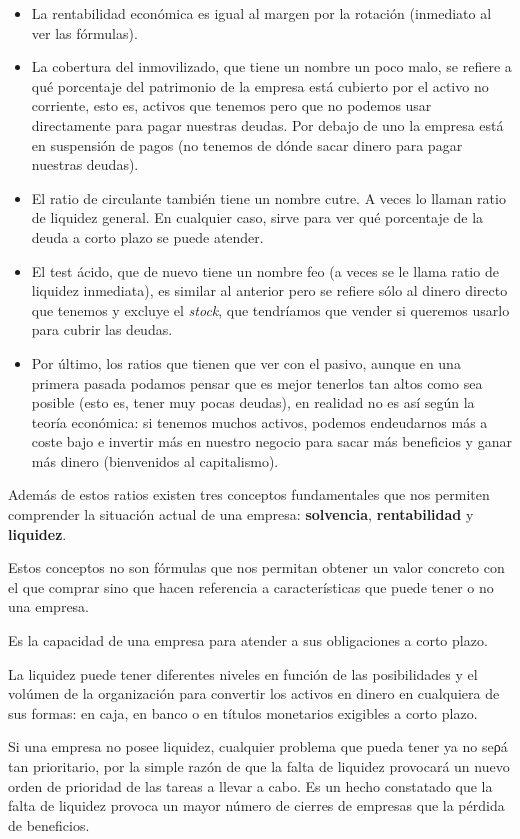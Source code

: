 \documentclass[nochap,palatino,shortheader]{apuntes}
\begin{document}
\begin{itemize}
\item La rentabilidad económica es igual al margen por la rotación (inmediato al ver las fórmulas).
\item La cobertura del inmovilizado, que tiene un nombre un poco malo, se refiere a qué porcentaje del patrimonio de la empresa está cubierto por el activo no corriente, esto es, activos que tenemos pero que no podemos usar directamente para pagar nuestras deudas. Por debajo de uno la empresa está en suspensión de pagos (no tenemos de dónde sacar dinero para pagar nuestras deudas).
\item El ratio de circulante también tiene un nombre cutre. A veces lo llaman ratio de liquidez general. En cualquier caso, sirve para ver qué porcentaje de la deuda a corto plazo se puede atender.
\item El test ácido, que de nuevo tiene un nombre feo (a veces se le llama ratio de liquidez inmediata), es similar al anterior pero se refiere sólo al dinero directo que tenemos y excluye el \textit{stock}, que tendríamos que vender si queremos usarlo para cubrir las deudas.
\item Por último, los ratios que tienen que ver con el pasivo, aunque en una primera pasada podamos pensar que es mejor tenerlos tan altos como sea posible (esto es, tener muy pocas deudas), en realidad no es así según la teoría económica: si tenemos muchos activos, podemos endeudarnos más a coste bajo e invertir más en nuestro negocio para sacar más beneficios y ganar más dinero (bienvenidos al capitalismo).
\end{itemize}

Además de estos ratios existen tres conceptos fundamentales que nos permiten comprender la situación actual de una empresa: \textbf{solvencia}, \textbf{rentabilidad} y \textbf{liquidez}.

Estos conceptos no son fórmulas que nos permitan obtener un valor concreto con el que comprar sino que hacen referencia a características que puede tener o no una empresa.

\begin{defn}[Liquidez]
Es la capacidad de una empresa para atender a sus obligaciones a corto plazo.

La liquidez puede tener diferentes niveles en función de las posibilidades y el volúmen de la organización para convertir los activos en dinero en cualquiera de sus formas: en caja, en banco o en títulos monetarios exigibles a corto plazo.

Si una empresa no posee liquidez, cualquier problema que pueda tener ya no seρá tan prioritario, por la simple razón de que la falta de liquidez provocará un nuevo orden de prioridad de las tareas a llevar a cabo. Es un hecho constatado que la falta de liquidez provoca un mayor número de cierres de empresas que la pérdida de beneficios.
\end{defn}
\end{document}
